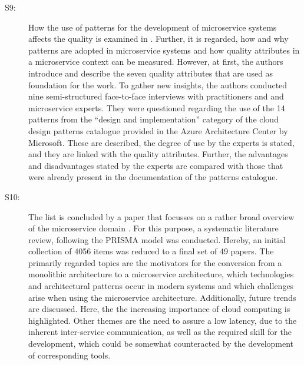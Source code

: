 \documentclass{bmcart}
\begin{document}
\begin{description}
  \item[S9:] How the use of patterns for the development of microservice systems affects the quality is examined in \cite{Vale.2022}. Further, it is regarded, how and why patterns are adopted in microservice systems and how quality attributes in a microservice context can be measured. However, at first, the authors introduce and describe the seven quality attributes that are used as foundation for the work. To gather new insights, the authors conducted nine semi-structured face-to-face interviews with practitioners and and microservice experts. They were questioned regarding the use of the 14 patterns from the “design and implementation” category of the cloud design patterns catalogue \cite{AAC.2022} provided in the Azure Architecture Center by Microsoft. These are described, the degree of use by the experts is stated, and they are linked with the quality attributes. Further, the advantages and disadvantages stated by the experts are compared with those that were already present in the documentation of the patterns catalogue.
  \item[S10:] The list is concluded by a paper that focusses on a rather broad overview of the microservice domain \cite{Weerasinghe.2022}. For this purpose, a systematic literature review, following the PRISMA model \cite{Page.2021} was conducted. Hereby, an initial collection of 4056 items was reduced to a final set of 49 papers. The primarily regarded topics are the motivators for the conversion from a monolithic architecture to a microservice architecture, which technologies and architectural patterns occur in modern systems and which challenges arise when using the microservice architecture. Additionally, future trends are discussed. Here, the the increasing importance of cloud computing is highlighted. Other themes are the need to assure a low latency, due to the inherent inter-service communication, as well as the required skill for the development, which could be somewhat counteracted by the development of corresponding tools.
\end{description}
\end{document}
